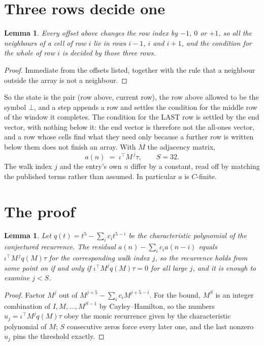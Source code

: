 \documentclass[11pt,a4paper]{article}
\theoremstyle{plain}
\newtheorem{lemma}[theorem]{Lemma}
\theoremstyle{definition}
\begin{document}
\section{Three rows decide one}

\begin{lemma}\label{lem:win}
Every offset above changes the row index by $-1$, $0$ or $+1$, so all the neighbours of a cell
of row $i$ lie in rows $i-1$, $i$ and $i+1$, and the condition for the whole of row $i$ is
decided by those three rows.
\end{lemma}

\begin{proof}
Immediate from the offsets listed, together with the rule that a neighbour outside the array is
not a neighbour.
\end{proof}

So the state is the pair (row above, current row), the row above allowed to be the symbol
$\bot$, and a step appends a row and settles the condition for the middle row of the window it
completes. The condition for the LAST row is settled by the end vector, with nothing below it:
the end vector is therefore not the all-ones vector, and a row whose cells find what they need
only because a further row is written below them does not finish an array. With $M$ the
adjacency matrix,
\[
a(n)\;=\;\iota^{\!\top}M^{\,j}\tau ,\qquad S=32.
\]
The walk index $j$ and the entry's own $n$ differ by a constant, read off by matching the
published terms rather than assumed. In particular $a$ is $C$-finite.

\section{The proof}

\begin{lemma}\label{lem:crit}
Let $q(t)=t^{5}-\sum_i c_it^{5-i}$ be the characteristic polynomial of the
conjectured recurrence. The residual $a(n)-\sum_ic_ia(n-i)$ equals
$\iota^{\!\top}M^{\,j}q(M)\tau$ for the corresponding walk index $j$, so the recurrence
holds from some point on if and only if $\iota^{\!\top}M^{j}q(M)\tau=0$ for all large $j$,
and it is enough to examine $j<S$.
\end{lemma}

\begin{proof}
Factor $M^{j}$ out of $M^{j+5}-\sum_ic_iM^{j+5-i}$. For the bound, $M^{S}$
is an integer combination of $I,M,\dots,M^{S-1}$ by Cayley--Hamilton, so the numbers
$u_j=\iota^{\!\top}M^{j}q(M)\tau$ obey the monic recurrence given by the characteristic
polynomial of $M$; $S$ consecutive zeros force every later one, and the last nonzero $u_j$
pins the threshold exactly.
\end{proof}
\end{document}
